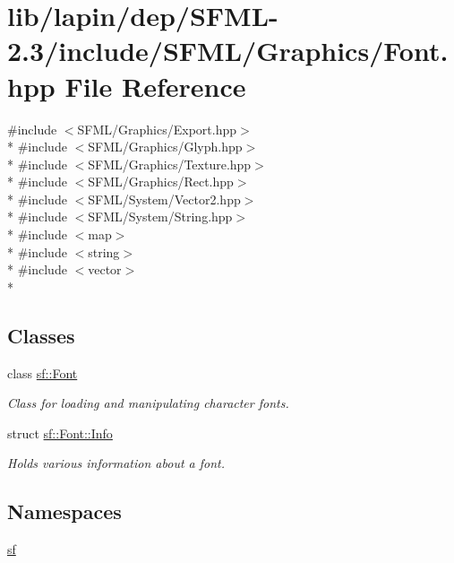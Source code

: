 \hypertarget{lapin_2dep_2_s_f_m_l-2_83_2include_2_s_f_m_l_2_graphics_2_font_8hpp}{\section{lib/lapin/dep/\-S\-F\-M\-L-\/2.3/include/\-S\-F\-M\-L/\-Graphics/\-Font.hpp File Reference}
\label{lapin_2dep_2_s_f_m_l-2_83_2include_2_s_f_m_l_2_graphics_2_font_8hpp}
}
{\ttfamily \#include $<$S\-F\-M\-L/\-Graphics/\-Export.\-hpp$>$}\\*
{\ttfamily \#include $<$S\-F\-M\-L/\-Graphics/\-Glyph.\-hpp$>$}\\*
{\ttfamily \#include $<$S\-F\-M\-L/\-Graphics/\-Texture.\-hpp$>$}\\*
{\ttfamily \#include $<$S\-F\-M\-L/\-Graphics/\-Rect.\-hpp$>$}\\*
{\ttfamily \#include $<$S\-F\-M\-L/\-System/\-Vector2.\-hpp$>$}\\*
{\ttfamily \#include $<$S\-F\-M\-L/\-System/\-String.\-hpp$>$}\\*
{\ttfamily \#include $<$map$>$}\\*
{\ttfamily \#include $<$string$>$}\\*
{\ttfamily \#include $<$vector$>$}\\*
\subsection*{Classes}
\begin{DoxyCompactItemize}
\item 
class \hyperlink{classsf_1_1_font}{sf\-::\-Font}
\begin{DoxyCompactList}\small\item\em Class for loading and manipulating character fonts. \end{DoxyCompactList}\item 
struct \hyperlink{structsf_1_1_font_1_1_info}{sf\-::\-Font\-::\-Info}
\begin{DoxyCompactList}\small\item\em Holds various information about a font. \end{DoxyCompactList}\end{DoxyCompactItemize}
\subsection*{Namespaces}
\begin{DoxyCompactItemize}
\item 
\hyperlink{namespacesf}{sf}
\end{DoxyCompactItemize}
